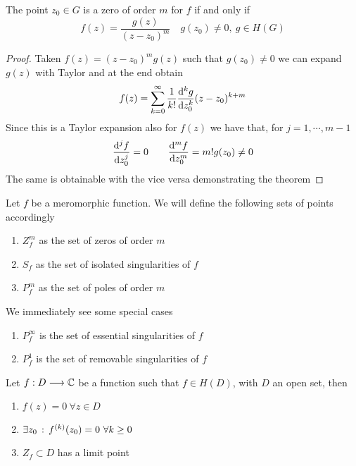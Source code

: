 \documentclass[../complete.tex]{subfiles}
\begin{document}
\begin{thm}
	The point $z_0\in G$ is a zero of order $m$ for $f$ if and only if
	\begin{equation*}
		f(z)=\frac{g(z)}{(z-z_0)^m}\quad g(z_0)\ne0,\ g\in H(G)
	\end{equation*}
\end{thm}
\begin{proof}
	Taken $f(z)=(z-z_0)^mg(z)$ such that $g(z_0)\ne0$ we can expand $g(z)$ with Taylor and at the end obtain
	\begin{equation*}
		f(z)=\sum_{k=0}^{\infty}\frac{1}{k!}\derivative[k]{g}{z_0}{(z-z_0)^{k+m}}
	\end{equation*}
	Since this is a Taylor expansion also for $f(z)$ we have that, for $j=1,\cdots,m-1$
	\begin{equation*}
		\derivative[j]{f}{z_0}=0\qquad\derivative[m]{f}{z_0}=m!g(z_0)\ne0
	\end{equation*}
	The same is obtainable with the vice versa demonstrating the theorem
\end{proof}
\begin{ntn}
	Let $f$ be a meromorphic function. We will define the following sets of points accordingly
	\begin{enumerate}
	\item $Z_f^m$ as the set of zeros of order $m$
	\item $S_f$ as the set of isolated singularities of $f$
	\item $P_f^m$ as the set of poles of order $m$
	\end{enumerate}
	We immediately see some special cases
	\begin{enumerate}
	\item $P_f^\infty$ is the set of essential singularities of $f$
	\item $P_f^1$ is the set of removable singularities of $f$
	\end{enumerate}
\end{ntn}
\begin{thm}
	Let $f:D\overset{}{\longrightarrow}\mathbb{C}$ be a function such that $f\in H(D)$, with $D$ an open set, then
	\begin{enumerate}
	\item $f(z)=0\ \forall z\in D$
	\item $\exists z_0\, :\,  f^{(k)}(z_0)=0\ \forall k\ge0$
	\item $Z_f\subset D$ has a limit point
	\end{enumerate}
\end{thm}
\end{document}
